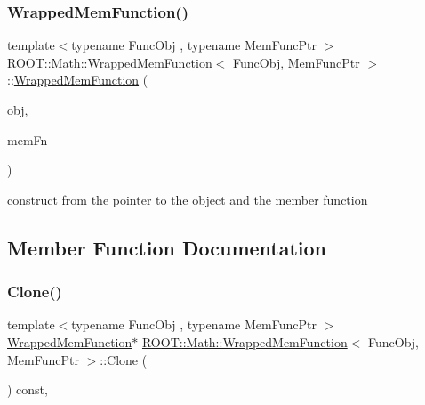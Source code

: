 \subsubsection{\texorpdfstring{WrappedMemFunction()}{WrappedMemFunction()}\hspace{0.1cm}{\footnotesize\ttfamily [2/2]}}
{\footnotesize\ttfamily template$<$typename Func\+Obj , typename Mem\+Func\+Ptr $>$ \\
\mbox{\hyperlink{classROOT_1_1Math_1_1WrappedMemFunction}{R\+O\+O\+T\+::\+Math\+::\+Wrapped\+Mem\+Function}}$<$ Func\+Obj, Mem\+Func\+Ptr $>$\+::\mbox{\hyperlink{classROOT_1_1Math_1_1WrappedMemFunction}{Wrapped\+Mem\+Function}} (\begin{DoxyParamCaption}\item[{Func\+Obj \&}]{obj,  }\item[{Mem\+Func\+Ptr}]{mem\+Fn }\end{DoxyParamCaption})\hspace{0.3cm}{\ttfamily [inline]}}

construct from the pointer to the object and the member function 

\subsection{Member Function Documentation}
\mbox{\label{classROOT_1_1Math_1_1WrappedMemFunction_a6f27e92240e16003ff20c25df6fba1eb}} 
\subsubsection{\texorpdfstring{Clone()}{Clone()}\hspace{0.1cm}{\footnotesize\ttfamily [1/2]}}
{\footnotesize\ttfamily template$<$typename Func\+Obj , typename Mem\+Func\+Ptr $>$ \\
\mbox{\hyperlink{classROOT_1_1Math_1_1WrappedMemFunction}{Wrapped\+Mem\+Function}}$\ast$ \mbox{\hyperlink{classROOT_1_1Math_1_1WrappedMemFunction}{R\+O\+O\+T\+::\+Math\+::\+Wrapped\+Mem\+Function}}$<$ Func\+Obj, Mem\+Func\+Ptr $>$\+::Clone (\begin{DoxyParamCaption}{ }\end{DoxyParamCaption}) const\hspace{0.3cm}{\ttfamily [inline]}, {\ttfamily [virtual]}}



